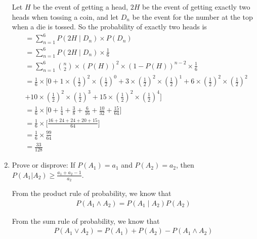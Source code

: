 \begin{enumerate}
Let $H$ be the event of getting a head, $2H$ be the event of getting exactly two heads when tossing a coin, and let $D_n$ be the event for the number at the top when a die is tossed. So the probability of exactly two heads is
\begin{equation*}
\begin{aligned}
&= \sum_{n=1}^6  P(2H \mid D_n) \times P(D_n)\\
&= \sum_{n=1}^6  P(2H \mid D_n) \times \frac{1}{6}\\
&= \sum_{n=1}^6  {n \choose 2} \times \left( P(H) \right ) ^ 2  \times \left(1- P(H) \right ) ^ {n-2} \times \frac{1}{6}\\
&= \frac{1}{6} \times \bigl [ 0 +  1 \times \left(\frac{1}{2} \right)^2 \times \left (\frac{1}{2}\right )^0 + 3 \times \left(\frac{1}{2} \right)^2 \times \left (\frac{1}{2}\right )^1 + 6 \times \left(\frac{1}{2} \right)^2 \times \left (\frac{1}{2}\right )^2 \\
&+10 \times \left(\frac{1}{2} \right)^2 \times \left (\frac{1}{2}\right )^3  + 15 \times \left(\frac{1}{2} \right)^2 \times \left (\frac{1}{2}\right )^4 \bigr ]\\
&= \frac{1}{6} \times \bigl [ 0 +  \frac{1}{4} + \frac{3}{8} + \frac{6}{16} + \frac{10}{32} + \frac{15}{64}\bigr ]\\
&= \frac{1}{6} \times \bigl [ \frac{16+24+ 24+20+15}{64}\bigr ]\\
&=\frac{1}{6} \times\frac{99}{64} \\
&=\frac{33}{128}
\end{aligned}   
\end{equation*}  
  
\item \relax[4 points] Prove or disprove: If $P(A_1) = a_1$ and
  $P(A_2) = a_2$, then $P(A_1 | A_2) \geq \frac{a_1 + a_2 -1}{a_2}$.
  
From the product rule of probability, we know that
\begin{equation}
\label{ProductRule}
\begin{aligned}
P(A_1 \wedge A_2) = P(A_1 \mid A_2) P(A_2)  
\end{aligned}   
\end{equation}  

From the sum rule of probability, we know that
\begin{equation}
\label{SumRule}
\begin{aligned}
P(A_1 \vee A_2) = P(A_1) + P(A_2) - P(A_1 \wedge A_2)  
\end{aligned}   
\end{equation}    
 

\end{enumerate}
